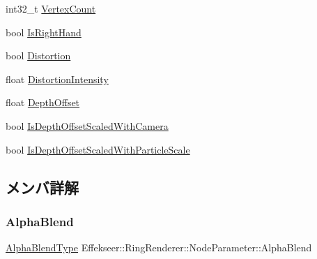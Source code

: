 \begin{DoxyCompactItemize}
\item 
int32\+\_\+t \mbox{\hyperlink{struct_effekseer_1_1_ring_renderer_1_1_node_parameter_a25fe9b429b69811b492894d938df31a7}{Vertex\+Count}}
\item 
bool \mbox{\hyperlink{struct_effekseer_1_1_ring_renderer_1_1_node_parameter_af7487f0fad4be89535f67b8927c3bf67}{Is\+Right\+Hand}}
\item 
bool \mbox{\hyperlink{struct_effekseer_1_1_ring_renderer_1_1_node_parameter_a0a2ba718e4b716c3959216d5e22758a3}{Distortion}}
\item 
float \mbox{\hyperlink{struct_effekseer_1_1_ring_renderer_1_1_node_parameter_a533b7d84f37defe0accbcfaeb2a4ed50}{Distortion\+Intensity}}
\item 
float \mbox{\hyperlink{struct_effekseer_1_1_ring_renderer_1_1_node_parameter_a653a2891300dca269562fc68e55eb2e4}{Depth\+Offset}}
\item 
bool \mbox{\hyperlink{struct_effekseer_1_1_ring_renderer_1_1_node_parameter_a2c32d13c1ffbe118b59348986daba290}{Is\+Depth\+Offset\+Scaled\+With\+Camera}}
\item 
bool \mbox{\hyperlink{struct_effekseer_1_1_ring_renderer_1_1_node_parameter_ae917bd956f2a24b7b387b80edf047604}{Is\+Depth\+Offset\+Scaled\+With\+Particle\+Scale}}
\end{DoxyCompactItemize}


\subsection{メンバ詳解}
\mbox{\label{struct_effekseer_1_1_ring_renderer_1_1_node_parameter_a73f862f36c32e13c7e3109be755acad3}} 
\subsubsection{\texorpdfstring{Alpha\+Blend}{AlphaBlend}}
{\footnotesize\ttfamily \mbox{\hyperlink{namespace_effekseer_a8c32fd5b7ec7feed73314b2ae8086949}{Alpha\+Blend\+Type}} Effekseer\+::\+Ring\+Renderer\+::\+Node\+Parameter\+::\+Alpha\+Blend}

\mbox{\label{struct_effekseer_1_1_ring_renderer_1_1_node_parameter_a834a9662e348bf4b79779586628530a5}} 
